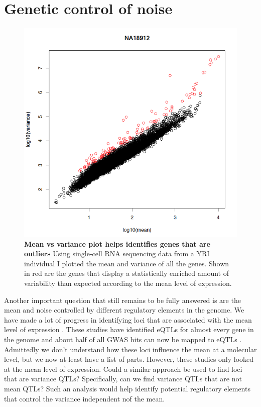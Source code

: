 \section{Genetic control of noise}

\begin{figure}[t!]  
    \centering
    \includegraphics[width=\linewidth, scale=0.25]{figures/intro/intro_outlier1.png}
    \caption[Mean vs variance plot helps identifies genes that are outliers]{%
        \textbf{Mean vs variance plot helps identifies genes that are outliers}
        Using single-cell RNA sequencing data from a YRI individual \cite{sarkar_discovery_2018} I plotted the mean and variance of all the genes. Shown in red are the genes that display a statistically enriched amount of variability than expected according to the mean level of expression. 
    }
    \label{fig:intro1}
\end{figure}

Another important question that still remains to be fully answered is are the mean and noise controlled by different regulatory elements in the genome. We have made a lot of progress in identifying loci that are associated with the mean level of expression \cite{gtex_consortium_genetic_2017} \cite{vosa2021ng} \cite{wen2017pg}. These studies have identified eQTLs for almost every gene in the genome and about half of all GWAS hits can now be mapped to eQTLs \cite{gtex_consortium_genetic_2017}. Admittedly we don't understand how these loci influence the mean at a molecular level, but we now at-least have a list of parts. However, these studies only looked at the mean level of expression. Could a similar approach be used to find loci that are variance QTLs? Specifically, can we find variance QTLs that are not mean QTLs? Such an analysis would help identify potential regulatory elements that control the variance independent nof the mean.


